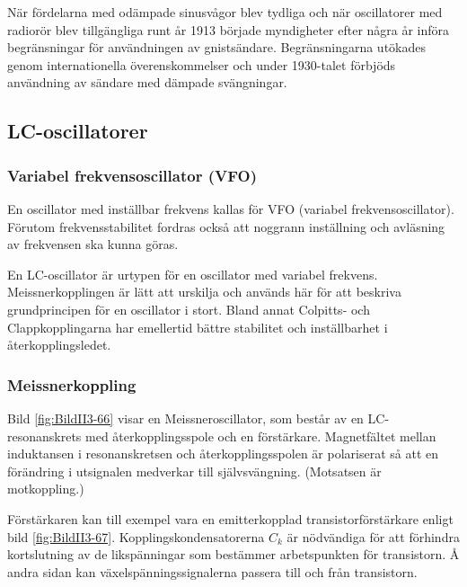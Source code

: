När fördelarna med odämpade sinusvågor blev tydliga och när oscillatorer med
radiorör blev tillgängliga runt år 1913 började myndigheter efter några år
införa begränsningar för användningen av gnistsändare.
Begränsningarna utökades genom internationella överenskommelser och under
1930-talet förbjöds användning av sändare med dämpade svängningar.

\subsection{LC-oscillatorer}

\subsubsection{Variabel frekvensoscillator (VFO)}


En oscillator med inställbar frekvens kallas för VFO (variabel
frekvensoscillator).
Förutom frekvensstabilitet fordras också att noggrann inställning och
avläsning av frekvensen ska kunna göras.

En LC-oscillator är urtypen för en oscillator med variabel frekvens.
Meissnerkopplingen är lätt att urskilja och används här för att beskriva
grundprincipen för en oscillator i stort.
Bland annat Colpitts- och Clappkopplingarna har emellertid bättre stabilitet
och inställbarhet i återkopplingsledet.

\subsubsection{Meissnerkoppling}

Bild \ref{fig:BildII3-66} visar en Meissneroscillator, som består av en
LC-resonanskrets med återkopplingsspole och en förstärkare.
Magnetfältet mellan induktansen i resonanskretsen och återkopplingsspolen är
polariserat så att en förändring i utsignalen medverkar till självsvängning.
(Motsatsen är motkoppling.)

Förstärkaren kan till exempel vara en emitterkopplad transistorförstärkare enligt bild
\ref{fig:BildII3-67}.
Kopplingskondensatorerna \(C_k\) är nödvändiga för att förhindra kortslutning
av de likspänningar som bestämmer arbetspunkten för transistorn.
Å andra sidan kan växelspänningssignalerna passera till och från transistorn.

